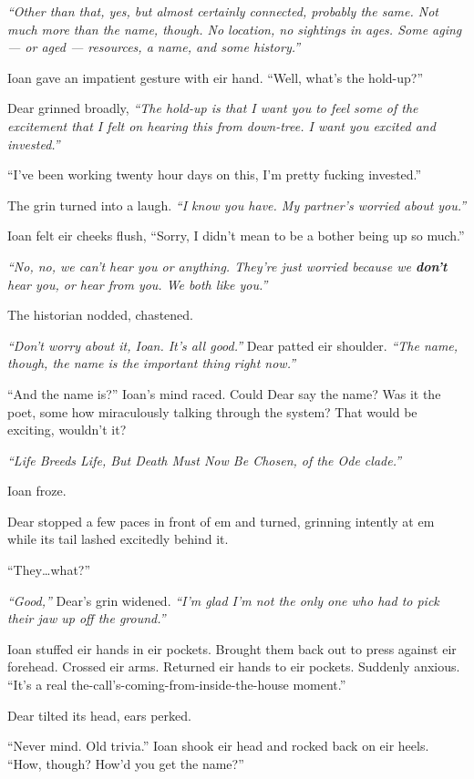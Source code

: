 \emph{``Other than that, yes, but almost certainly connected, probably the same. Not much more than the name, though. No location, no sightings in ages. Some aging --- or aged --- resources, a name, and some history.''}

Ioan gave an impatient gesture with eir hand. ``Well, what's the hold-up?''

Dear grinned broadly, \emph{``The hold-up is that I want you to feel some of the excitement that I felt on hearing this from down-tree. I want you excited and invested.''}

``I've been working twenty hour days on this, I'm pretty fucking invested.''

The grin turned into a laugh. \emph{``I know you have. My partner's worried about you.''}

Ioan felt eir cheeks flush, ``Sorry, I didn't mean to be a bother being up so much.''

\emph{``No, no, we can't hear you or anything. They're just worried because we \textbf{don't} hear you, or hear from you. We both like you.''}

The historian nodded, chastened.

\emph{``Don't worry about it, Ioan. It's all good.''} Dear patted eir shoulder. \emph{``The name, though, the name is the important thing right now.''}

``And the name is?'' Ioan's mind raced. Could Dear say the name? Was it the poet, some how miraculously talking through the system? That would be exciting, wouldn't it?

\emph{``Life Breeds Life, But Death Must Now Be Chosen, of the Ode clade.''}

Ioan froze.

Dear stopped a few paces in front of em and turned, grinning intently at em while its tail lashed excitedly behind it.

``They\ldots{}what?''

\emph{``Good,''} Dear's grin widened. \emph{``I'm glad I'm not the only one who had to pick their jaw up off the ground.''}

Ioan stuffed eir hands in eir pockets. Brought them back out to press against eir forehead. Crossed eir arms. Returned eir hands to eir pockets. Suddenly anxious. ``It's a real the-call's-coming-from-inside-the-house moment.''

Dear tilted its head, ears perked.

``Never mind. Old trivia.'' Ioan shook eir head and rocked back on eir heels. ``How, though? How'd you get the name?''

